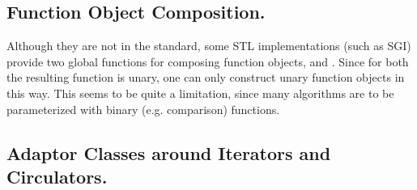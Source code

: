 \subsection*{Function Object Composition.}

Although they are not in the standard, some STL implementations (such
as SGI) provide two global functions for composing function objects,
 and . Since for both the
resulting function is unary, one can only construct unary function
objects in this way. This seems to be quite a limitation, since many
algorithms are to be parameterized with binary (e.g. comparison)
functions.


\subsection*{Adaptor Classes around Iterators and Circulators.}

\\
\\
\\
\\
\\


